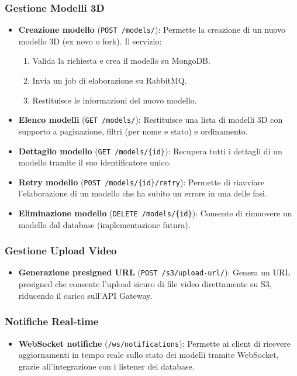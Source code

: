 \subsubsection{Gestione Modelli 3D}

\begin{itemize}
	\item \textbf{Creazione modello} (\texttt{POST /models/}): Permette la creazione di un nuovo modello 3D (ex novo o fork). Il servizio:
	\begin{enumerate}
		\item Valida la richiesta e crea il modello su MongoDB.
		\item Invia un job di elaborazione su RabbitMQ.
		\item Restituisce le informazioni del nuovo modello.
	\end{enumerate}
	\item \textbf{Elenco modelli} (\texttt{GET /models/}): Restituisce una lista di modelli 3D con supporto a paginazione, filtri (per nome e stato) e ordinamento.
	\item \textbf{Dettaglio modello} (\texttt{GET /models/\{id\}}): Recupera tutti i dettagli di un modello tramite il suo identificatore unico.
	\item \textbf{Retry modello} (\texttt{POST /models/\{id\}/retry}): Permette di riavviare l’elaborazione di un modello che ha subito un errore in una delle fasi.
	\item \textbf{Eliminazione modello} (\texttt{DELETE /models/\{id\}}): Consente di rimuovere un modello dal database (implementazione futura).
\end{itemize}

\subsubsection{Gestione Upload Video}

\begin{itemize}
	\item \textbf{Generazione presigned URL} (\texttt{POST /s3/upload-url/}): Genera un URL presigned che consente l’upload sicuro di file video direttamente su S3, riducendo il carico sull’API Gateway.
\end{itemize}

\subsubsection{Notifiche Real-time}

\begin{itemize}
	\item \textbf{WebSocket notifiche} (\texttt{/ws/notifications}): Permette ai client di ricevere aggiornamenti in tempo reale sullo stato dei modelli tramite WebSocket, grazie all’integrazione con i listener del database.
\end{itemize}

